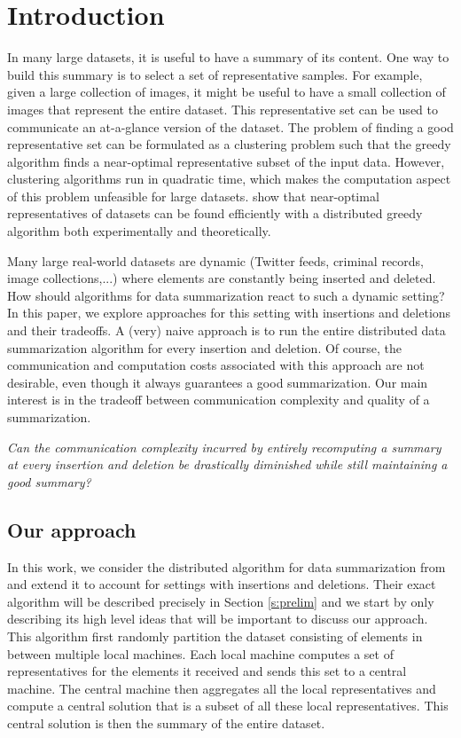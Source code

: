 \section{Introduction}

In many large datasets, it is useful to have a summary of its content. One way to build this summary is to select a set of representative samples. For example, given a large collection of images, it might be useful to have a small collection of images that represent the entire dataset. This representative set can be used to communicate an at-a-glance version of the dataset. The problem of finding a good representative set can be formulated as a clustering problem such that the greedy algorithm finds a near-optimal representative subset of the input data. However, clustering algorithms run in quadratic time, which makes the computation aspect of this problem unfeasible for large datasets. \citet{mirzasoleiman2013distributed} show that near-optimal representatives of datasets can be found efficiently with a distributed greedy algorithm both experimentally and theoretically.

Many large real-world datasets are dynamic (Twitter feeds, criminal records, image collections,...) where elements are constantly being inserted and deleted. How should algorithms for data summarization react to such a dynamic setting? In this paper, we explore approaches for this setting with insertions and deletions and their tradeoffs. A (very) naive approach is to run the entire distributed data summarization algorithm for every insertion and deletion. Of course, the communication and computation costs associated with this approach are not desirable, even though it always guarantees a good summarization. Our main interest is in the tradeoff between communication complexity and quality of a summarization. 

\begin{center}
\textit{Can the communication complexity incurred by entirely recomputing a summary at every insertion and deletion be drastically diminished while still maintaining a good summary?}
\end{center}

	
	
	\subsection{Our approach}
	
	In this work, we consider the distributed algorithm for data summarization from \citet{mirzasoleiman2013distributed} and extend it to account for settings with insertions and deletions. Their exact algorithm will be described precisely in Section \ref{s:prelim} and we start by only describing its high level ideas that will be important to discuss our approach. This algorithm first randomly partition the dataset consisting of elements in between multiple local machines. Each local machine computes a set of representatives for the elements it received and sends this set to a central machine. The central machine then aggregates all the local representatives and compute a central solution that is a subset of all these local representatives. This central solution is then the summary of the entire dataset.
	
